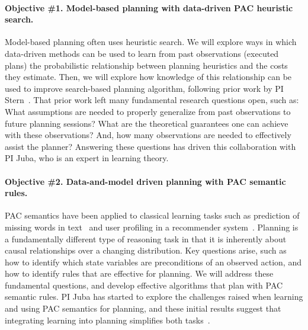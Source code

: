 \documentclass[12pt]{article}
\begin{document}
\paragraph{Objective \#1. Model-based planning with data-driven PAC heuristic search.}
Model-based planning often uses heuristic search. We will explore ways in which data-driven methods can be used to learn from past observations (executed plans) the probabilistic relationship between planning heuristics and the costs they estimate. Then, we will explore how knowledge of this relationship can be used to improve search-based planning algorithm, following prior work by PI Stern~\cite{stern2011probably,stern2012exploring,stern2014potential}.
That prior work left many fundamental research questions open, such as: What assumptions are needed to properly generalize from past observations to future planning sessions? What are the theoretical guarantees one can achieve with these observations? And, how many observations are needed to effectively assist the planner? Answering these questions has driven this collaboration with PI Juba, who is an expert in learning theory. 


\vspace{-0.35cm}
\paragraph{Objective \#2. Data-and-model driven planning with PAC semantic rules.}
PAC semantics have been applied to classical learning tasks such as prediction of missing words in text~\cite{michael2008first} and user profiling in a recommender system~\cite{semeraro2009knowledge}. Planning is a fundamentally different type of reasoning task in that it is inherently about causal relationships over a changing distribution. Key questions arise, such as how to identify which state variables are preconditions of an observed action, and how to identify rules that are effective for planning. We will address these fundamental questions, and 
develop effective algorithms that plan with PAC semantic rules. PI Juba has started to explore the challenges raised when learning and using PAC semantics for planning, and these initial results suggest that integrating learning into planning simplifies both tasks~\cite{juba2016jmlr}. 
\end{document}

